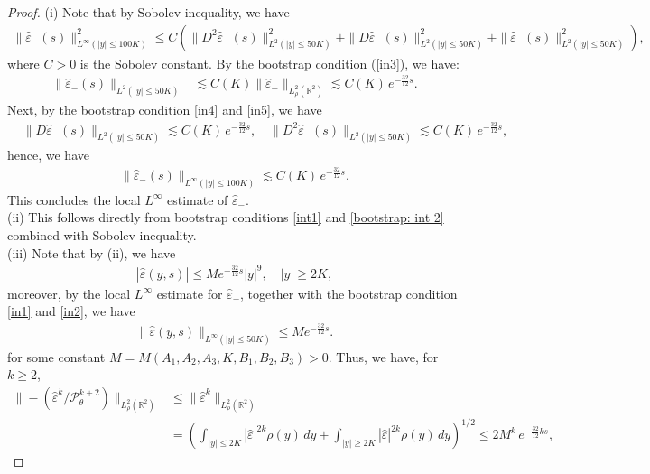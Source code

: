 \documentclass[10pt,a4paper]{amsart}
\newcommand{\veph}{\hat\varepsilon }
\begin{document}
\begin{proof}(i) Note that by Sobolev inequality, we have
    \begin{align*}
      \|\veph_-(s)\|^2_{L^{\infty}(|y| \leq 100K)} \leq C\left(\|D^2 \veph_-(s)\|^2_{L^2(|y| \leq 50K)}+\|D \veph_-(s)\|^2_{L^2(|y| \leq 50K)}+\|\veph_-(s)\|^2_{L^2(|y| \leq 50K)}\right),
    \end{align*}
    where \(C>0\) is the Sobolev constant. By the bootstrap condition (\ref{in3}), we have:
   \begin{align*}
    \|\veph_-(s)\|_{L^2(|y| \leq 50K)}& \lesssim C(K) \|\veph_-\|_{L^2_{\rho}(\mathbb{R}^2)} \lesssim C(K)\,e^{-\frac{32}{12}s}.
   \end{align*}
Next, by the bootstrap condition \ref{in4} and \ref{in5}, we have
   \begin{align*}
      &\|D \veph_-(s)\|_{L^2(|y| \leq 50K)} \lesssim C(K)\,e^{-\frac{32}{12}s}, \quad \|D^2 \veph_-(s)\|_{L^2(|y| \leq 50K)} \lesssim C(K)\,e^{-\frac{32}{12}s},
   \end{align*}
hence, we have
   \begin{align*}
      \|\veph_-(s)\|_{L^{\infty}(|y| \leq 100 K)} \lesssim  C(K)\,e^{-\frac{32}{12}s}.
   \end{align*} 
This concludes the local \(L^{\infty}\) estimate of \(\veph_-\).\\
 (ii) This follows directly from bootstrap conditions \ref{int1} and \ref{bootstrap: int 2} combined with Sobolev inequality.\\
(iii)
Note that by (ii), we have
\begin{align}
\label{inq:ptwise1}
    |\veph(y,s)| \leq M e^{-\frac{32}{12}s}|y|^9, \quad |y| \geq 2K,
\end{align}
moreover, by the local \(L^{\infty}\) estimate for \(\veph_-\), together with the bootstrap condition \ref{in1} and \ref{in2}, we have
\begin{align}
\label{ptwise local veph 0}
    \|\veph(y,s)\|_{L^{\infty}(|y|\leq 50K)} \leq Me^{-\frac{32}{12}s}.
\end{align}
for some constant \(M=M(A_1,A_2,A_3,K,B_1,B_2,B_3)>0\). Thus, we have, for \(k \geq 2\),
    \begin{align*}
        \|-(\veph^k/\mathcal{P}_{\theta}^{k+2})\|_{L^2_{\rho}(\mathbb{R}^2)}& \leq \|\veph^k\|_{L^2_{\rho}(\mathbb{R}^2)}\\
        &=\left(\int_{|y| \leq 2K}|\veph|^{2k}\rho(y)\,dy+\int_{|y| \geq 2K}|\veph|^{2k}\rho(y)\,dy\right)^{1/2} \leq 2M^k\,e^{-\frac{32}{12}ks},
    \end{align*}

\end{proof}
\end{document}
